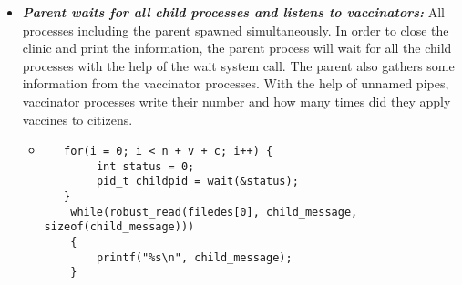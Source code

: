 \documentclass{article}
\begin{document}
\begin{itemize}
\begin{itemize}
  \item 
    \begin{lstlisting}
     /*Create n + v + c processes.*/
   //Some of the deallocations are deleted for simplicity in LaTeX
    for(i = 0; i < n + v + c; i++)
    {
        cur_pid[i]= fork();
        if(cur_pid[i] == 0)
        {
            robust_close(filedes[0]);
            //Nurse Section.
            if(i < n){
                nurse(fd,n, t, c, i, b);
                robust_semclose(mutex);
                free(cur_pid);
                _exit(EXIT_SUCCESS);
            }
            //Vaccinator section.
            else if((i >= n) && (i < n + v)){
                int vaccinated_count = vaccinator(fd, n, t, c, b, i);
                sprintf(child_message, "Vaccinator %d (pid=%d) vaccinated %d doses.\n", i - n + 1, getpid() ,vaccinated_count);
                robust_write(filedes[1], child_message, sizeof(child_message));
                robust_semclose(mutex);
                free(cur_pid);
                _exit(EXIT_SUCCESS);
            }
            //Citizen section.
            else if(i >= n + v){
                citizen(fd, n, t, c, v, i);
                robust_semclose(mutex);
                free(cur_pid);
                _exit(EXIT_SUCCESS);
            }
        }
        else if(cur_pid[i] == -1){
            perror("Fork:");
            fprintf(stderr, "FORK FAILURE. EXITING.\n");
            robust_semclose(mutex);
            free(cur_pid);
            exit(EXIT_FAILURE);
        }
    }
    \end{lstlisting}
\end{itemize}


\item \textbf{\textit{Parent waits for all child processes and listens to vaccinators:}}
All processes including the parent spawned simultaneously. In order to close the clinic and print the information, the parent process will wait for all the child processes with the help of the wait system call. The parent also gathers some information from the vaccinator processes. With the help of unnamed pipes, vaccinator processes write their number and how many times did they apply vaccines to citizens.
\begin{itemize}
  \item 
    \begin{lstlisting}
   for(i = 0; i < n + v + c; i++) {
        int status = 0;
        pid_t childpid = wait(&status);
   }
    while(robust_read(filedes[0], child_message, sizeof(child_message)))
    {
        printf("%s\n", child_message);
    }  


\end{lstlisting}
\end{itemize}
\end{itemize}
\end{document}
